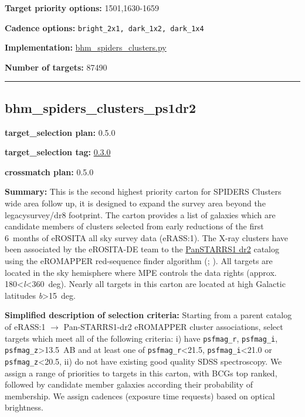 \noindent\textbf{Target priority options:} 1501,1630-1659

\noindent\textbf{Cadence options:} \texttt{bright\_2x1,\ dark\_1x2,\ dark\_1x4}

\noindent\textbf{Implementation:}
\href{https://github.com/sdss/target_selection/blob/0.3.0/python/target_selection/cartons/bhm_spiders_clusters.py}{bhm\_spiders\_clusters.py}

\noindent\textbf{Number of targets:} 87490

\begin{center}\rule{0.5\linewidth}{0.5pt}\end{center}

\hypertarget{bhm_spiders_clusters_ps1dr2_plan0.5.0}{%
\subsection{bhm\_spiders\_clusters\_ps1dr2}\label{bhm_spiders_clusters_ps1dr2_plan0.5.0}}

\noindent\textbf{target\_selection plan:} 0.5.0

\noindent\textbf{target\_selection tag:}
\href{https://github.com/sdss/target_selection/tree/0.3.0/}{0.3.0}

\noindent\textbf{crossmatch plan:} 0.5.0

\noindent\textbf{Summary:} This is the second highest priority carton for SPIDERS
Clusters wide area follow up, it is designed to expand the survey area
beyond the legacysurvey/dr8 footprint. The carton provides a list of
galaxies which are candidate members of clusters selected from early
reductions of the first 6~months of eROSITA all sky survey data
(eRASS:1). The X-ray clusters have been associated by the eROSITA-DE
team to the
\href{https://outerspace.stsci.edu/display/PANSTARRS/}{PanSTARRS1 dr2}
catalog using the eROMAPPER red-sequence finder algorithm
(\citealt{Rykoff2014};
\citealt{IderChitham2020}). All targets are located in the sky hemisphere
where MPE controls the data rights (approx.
180\textless{}\emph{l}\textless360~deg). Nearly all targets in this
carton are located at high Galactic latitudes
\textbar{}\emph{b}\textbar\textgreater15~deg.

\noindent\textbf{Simplified description of selection criteria:} Starting from a
parent catalog of eRASS:1 $\rightarrow$ Pan-STARRS1-dr2 eROMAPPER cluster
associations, select targets which meet all of the following criteria:
i) have \texttt{psfmag\_r}, \texttt{psfmag\_i},
\texttt{psfmag\_z}\textgreater13.5~AB and at least one of
\texttt{psfmag\_r}\textless21.5, \texttt{psfmag\_i}\textless21.0 or
\texttt{psfmag\_z}\textless20.5, ii) do not have existing good quality
SDSS spectroscopy. We assign a range of priorities to targets in this
carton, with BCGs top ranked, followed by candidate member galaxies
according their probability of membership. We assign cadences (exposure
time requests) based on optical brightness.


